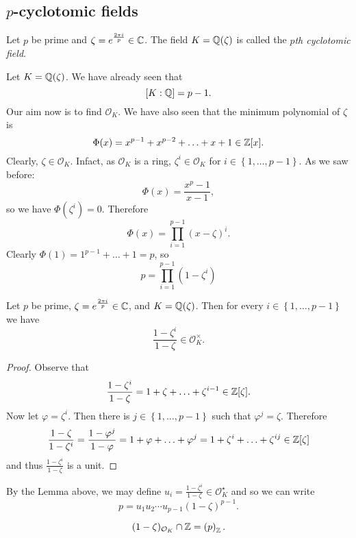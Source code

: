
\subsection{$p$-cyclotomic fields}

\begin{definition}
	Let $p$ be prime and $\zeta = e^{\frac{2\pi i}p} \in \mathbb{C}$.
	The field $K = \mathbb{Q}(\zeta)$ is called the
	\emph{$p$th cyclotomic field}.
\end{definition}

Let $K = \mathbb{Q}(\zeta)$. 
We have already seen that
\[
	[K: \mathbb{Q}] = p - 1.
\]
Our aim now is to find $\mathcal O_K$.
We have also seen that the minimum polynomial of $\zeta$ is
\[
	\Phi(x) = x^{p-1} + x^{p-2} + \ldots + x + 1 \in \mathbb{Z}[x].
\]
Clearly, $\zeta \in \mathcal O_K$.
Infact, as $\mathcal O_K$ is a ring, $\zeta^i \in \mathcal O_K$ for
$i \in \left\{
	1, \ldots, p-1
\right\}$.
As we saw before:
\[
	\Phi(x) = \frac{x^p - 1}{x - 1},
\]
so we have $\Phi(\zeta^i) = 0$.
Therefore
\[
	\Phi(x) = \prod_{i=1}^{p-1} (x - \zeta)^i.
\]
Clearly $\Phi(1) = 1^{p-1} + \ldots + 1 = p$, so
\[
	p = \prod_{i=1}^{p-1} \left( 
		1 - \zeta^i
	\right)
\]

\begin{lemma}[]
	Let $p$ be prime, $\zeta = e^{\frac{2\pi i}{p}} \in \mathbb{C}$, and
	$K = \mathbb{Q}(\zeta)$.
	Then for every $i \in \left\{
		1, \ldots, p-1
	\right\}$ we have
	\[
		\frac{1 - \zeta^i}{1 - \zeta} \in \mathcal O_K^\times.
	\]
\end{lemma}

\begin{proof}
	Observe that
	\[
		\frac{1 - \zeta^i}{1 - \zeta}
		= 1 + \zeta + \ldots + \zeta^{i-1}
		\in \mathbb{Z}[\zeta].
	\]
	Now let $\varphi = \zeta^i$.
	Then there is $j \in \left\{
		1, \ldots, p-1
	\right\}$ such that $\varphi^j = \zeta$.
	Therefore
	\[
		\frac{1 - \zeta}{1 - \zeta^i} 
		= \frac{1 - \varphi^j}{1 - \varphi}
		= 1 + \varphi + \ldots + \varphi^j
		= 1 + \zeta^i + \ldots + \zeta^{ij}
		\in \mathbb{Z}[\zeta]
	\]
	and thus $\frac{1 - \zeta^i}{1-\zeta}$ is a unit.
\end{proof}

By the Lemma above, we may define $
	u_i = \frac{1 - \zeta^i}{1 - \zeta} \in \mathcal O^\star_K
$ and so we can write \[
	p = u_1 u_2 \cdots u_{p-1} \left( 
		1 - \zeta 
	\right)^{p-1}.
\]

\begin{lemma}[]
	\hfill
	\vspace{-\baselineskip}
	\[
		(1-\zeta)_{\mathcal O_K} \cap \mathbb{Z} = \left( 
			p 
		\right)_{\mathbb{Z}}.
	\]
\end{lemma}

